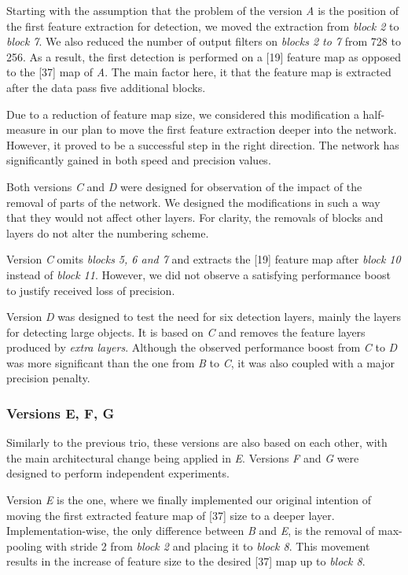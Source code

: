 Starting with the assumption that the problem of the version \textit{A} is the position of the first feature extraction for detection, we moved the extraction from \textit{block 2} to \textit{block 7}. We also reduced the number of output filters on \textit{blocks 2 to 7} from 728 to 256. As a result, the first detection is performed on a [19] feature map as opposed to the [37] map of \textit{A}. The main factor here, it that the feature map is extracted after the data pass five additional blocks. 

Due to a reduction of feature map size, we considered this modification a half-measure in our plan to move the first feature extraction deeper into the network. However, it proved to be a successful step in the right direction. The network has significantly gained in both speed and precision values. 

Both versions \textit{C} and \textit{D} were designed for observation of the impact of the removal of parts of the network. We designed the modifications in such a way that they would not affect other layers. For clarity, the removals of blocks and layers do not alter the numbering scheme.

Version \textit{C} omits \textit{blocks 5, 6 and 7} and extracts the [19] feature map after \textit{block 10} instead of \textit{block 11}. However, we did not observe a satisfying performance boost to justify received loss of precision. 

Version \textit{D} was designed to test the need for six detection layers, mainly the layers for detecting large objects. It is based on \textit{C} and removes the feature layers produced by \textit{extra layers}. Although the observed performance boost from \textit{C} to \textit{D} was more significant than the one from \textit{B} to \textit{C},  it was also coupled with a major precision penalty.

\subsubsection{Versions E, F, G}
Similarly to the previous trio, these versions are also based on each other, with the main architectural change being applied in \textit{E}. Versions \textit{F} and \textit{G} were designed to perform independent experiments. 

Version \textit{E} is the one, where we finally implemented our original intention of moving the first extracted feature map of [37] size to a deeper layer. Implementation-wise, the only difference between \textit{B} and \textit{E}, is the removal of max-pooling with stride 2 from \textit{block 2} and placing it to \textit{block 8}. This movement results in the increase of feature size to the desired [37] map up to \textit{block 8}.

